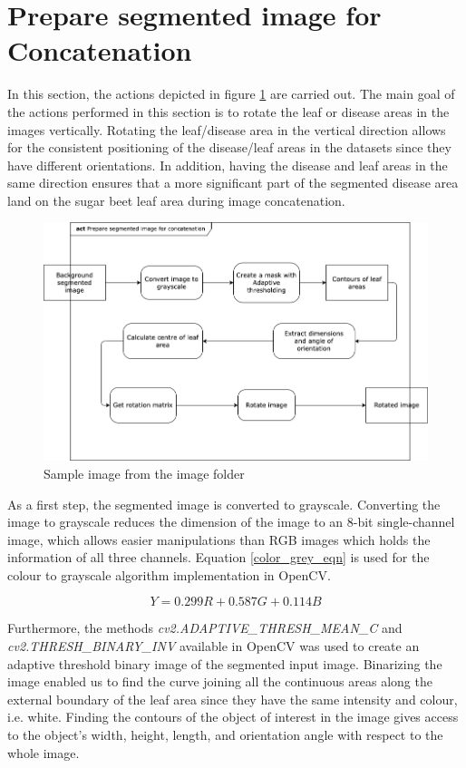 \section{Prepare segmented image for Concatenation}
In this section, the actions depicted in figure \ref{fig:myact3} are carried out. The main goal of the actions performed in this section is to rotate the leaf or disease areas in the images vertically. Rotating the leaf/disease area in the vertical direction allows for the consistent positioning of the disease/leaf areas in the datasets since they have different orientations. In addition, having the disease and leaf areas in the same direction ensures that a more significant part of the segmented disease area land on the sugar beet leaf area during image concatenation. 
\begin{figure}[!htb]
    \centering
    \includegraphics[scale=0.55, keepaspectratio]{Figures/act3.png}
    \caption{Sample image from the image folder}
    \label{fig:myact3}
\end{figure}

As a first step, the segmented image is converted to grayscale. Converting the image to grayscale reduces the dimension of the image to an 8-bit single-channel image, which allows easier manipulations than RGB images which holds the information of all three channels. Equation \ref{color_grey_eqn} is used for the colour to grayscale algorithm implementation in OpenCV.


\begin{equation} \label{color_grey_eqn}
Y = 0.299 R + 0.587 G + 0.114 B
\end{equation}


Furthermore, the  methods \textit{cv2.ADAPTIVE\_THRESH\_MEAN\_C} and\\ \textit{cv2.THRESH\_BINARY\_INV} available in OpenCV was used to create an adaptive threshold binary image of the segmented input image. Binarizing the image enabled us to find the curve joining all the continuous areas along the external boundary of the leaf area since they have the same intensity and colour, i.e. white. Finding the contours of the object of interest in the image gives access to the object’s width, height, length, and orientation angle with respect to the whole image.

